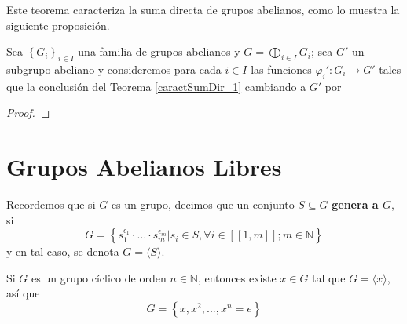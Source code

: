 \documentclass[12pt]{report}
\theoremstyle{largebreak}
\newcommand\cf[3]{\ensuremath{#1:#2\rightarrow#3}}
\newcommand\natint[1]{\ensuremath{\left[\!\left[ #1\right]\!\right]}}
\begin{document}
    Este teorema caracteriza la suma directa de grupos abelianos, como lo muestra la siguiente proposición.

    \begin{propo}
        \label{caractSumDir_2}
        Sea $\left\{G_i \right\}_{ i\in I}$ una familia de grupos abelianos y $G=\bigoplus_{ i\in I}G_i$; sea $G'$ un subgrupo abeliano y consideremos para cada $i\in I$ las funciones $\cf{\varphi_i'}{G_i}{G'}$ tales que la conclusión del Teorema \ref{caractSumDir_1} cambiando a $G'$ por 
    \end{propo}

    \begin{proof}
        
    \end{proof}



    \section{Grupos Abelianos Libres}

    Recordemos que si $G$ es un grupo, decimos que un conjunto $S\subseteq G$ \textbf{genera a $G$}, si
    \begin{equation*}
        G=\left\{s_1^{\epsilon_1}\cdot\dots\cdot s_m^{\epsilon_m}\Big|s_i\in S,\forall i\in\natint{1,m}; m\in\mathbb{N} \right\}
    \end{equation*}
    y en tal caso, se denota $G=\langle S\rangle$. 

    \begin{exa}
        Si $G$ es un grupo cíclico de orden $n\in\mathbb{N}$, entonces existe $x\in G$ tal que $G=\langle x\rangle$, así que
        \begin{equation*}
            G=\left\{x,x^2,...,x^n=e\right\}
        \end{equation*}
    \end{exa}
\end{document}
